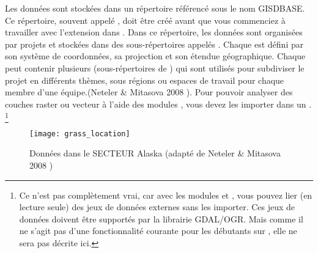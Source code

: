 Les données \grass sont stockées dans un répertoire référencé sous le nom GISDBASE. Ce répertoire, souvent appelé , doit être créé avant que vous commenciez à travailler avec l'extension \grass dans \qg. Dans ce répertoire, les données \grass sont organisées par projets et stockées dans des sous-répertoires appelés . Chaque  est défini par son système de coordonnées, sa projection et son étendue géographique. Chaque  peut contenir plusieurs  (sous-répertoires de ) qui sont utilisés pour subdiviser le projet en différents thèmes, sous régions ou espaces de travail pour chaque membre d'une équipe.(Neteler \& Mitasova 2008 \parencite{neteler_mitasova08}). Pour pouvoir analyser des couches raster ou vecteur à l'aide des modules \grass, vous devez les importer dans un . \footnote {Ce n'est pas complètement vrai, car avec les modules \grass {} et , vous pouvez lier (en lecture seule) des jeux de données externes sans les importer. Ces jeux de données doivent être supportés par la librairie GDAL/OGR. Mais comme il ne s'agit pas d'une fonctionnalité courante pour les débutants sur \grass, elle ne sera pas décrite ici.}
\begin{figure}[ht]
\begin{center}
\texttt{[image: grass\_location]}
\caption{Données \grass dans le SECTEUR Alaska (adapté de Neteler \& Mitasova 2008 \parencite{neteler_mitasova08})}\label{fig:grass_location}
\end{center}  
\end{figure}

